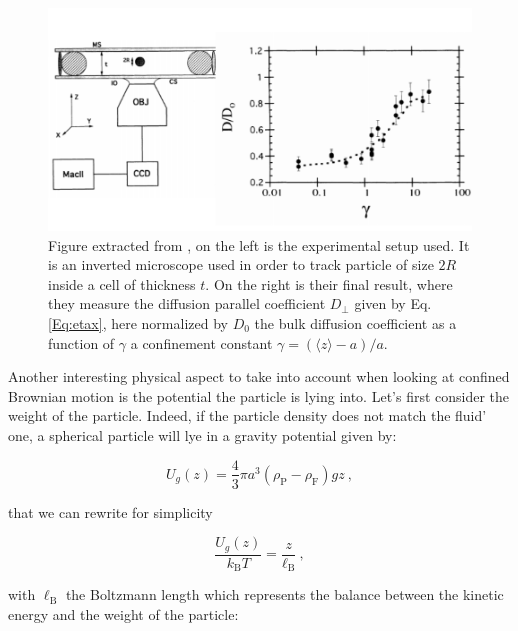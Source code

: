 \begin{figure}
	\centering
	\includegraphics{02_body/chapter1/image/libchaber.pdf}
	\caption{Figure extracted from \cite{faucheux_confined_1994}, on the left is the experimental setup used. It is an inverted microscope used in order to track particle of size $2R$ inside a cell of thickness $t$. On the right is their final result, where they measure the diffusion parallel coefficient $D_\bot$ given by Eq.\ref{Eq:etax}, here normalized by $D_0$ the bulk diffusion coefficient as a function of  $\gamma$ a confinement constant $\gamma = (\langle z \rangle -a)/a$. }
	\label{fig:libchaber}
\end{figure}

Another interesting physical aspect to take into account when looking at confined Brownian motion is the potential the particle is lying into. Let's first consider the weight of the particle. Indeed, if the particle density does not match the fluid' one, a spherical particle will lye in a gravity potential given by:

\begin{equation}
	U_g(z) = \frac{4}{3} \pi a^3 (\rho_\mathrm{P} - \rho_\mathrm{F})gz~,
\end{equation}


that we can rewrite for simplicity

\begin{equation}
	\frac{U_g(z)}{k_\mathrm{B} T} = \frac{z}{\ell_\mathrm{B}}~,
\end{equation}

with $\ell_\mathrm{B}$ the Boltzmann length which represents the balance between the kinetic energy and the weight of the particle:

